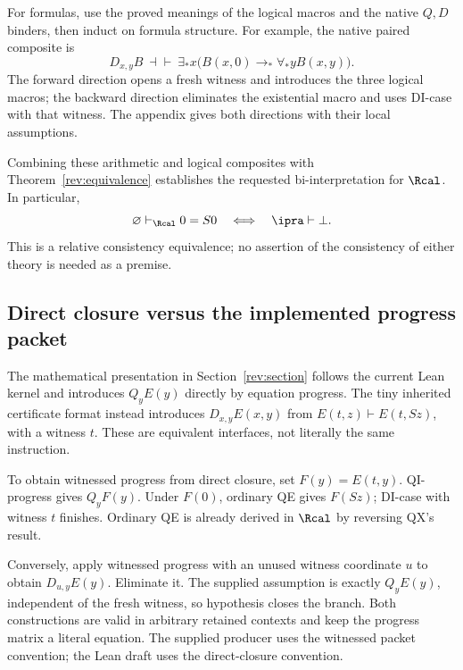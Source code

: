 For formulas, use the proved meanings of the logical macros and the
native $Q,D$ binders, then induct on formula structure. For example,
the native paired composite is
\[
 D_{x,y}B\ \dashv\vdash\
 \exists_*x\bigl(B(x,0)\to_*\forall_*y B(x,y)\bigr).
\]
The forward direction opens a fresh witness and introduces the three
logical macros; the backward direction eliminates the existential
macro and uses DI-case with that witness. The appendix gives both
directions with their local assumptions.

Combining these arithmetic and logical composites with
Theorem~\ref{rev:equivalence} establishes the requested bi-interpretation
for $\Rcal$. In particular,
\[
 \varnothing\vdash_{\Rcal}0=S0
 \quad\Longleftrightarrow\quad
 \ipra\vdash\bot.
\]
This is a relative consistency equivalence; no assertion of the
consistency of either theory is needed as a premise.

\subsection{Direct closure versus the implemented progress packet}
\label{sec:progress-packet}

The mathematical presentation in Section~\ref{rev:section} follows the
current Lean kernel and introduces $Q_yE(y)$ directly by equation
progress. The tiny inherited certificate format instead introduces
$D_{x,y}E(x,y)$ from $E(t,z)\vdash E(t,Sz)$, with a witness $t$.
These are equivalent interfaces, not literally the same instruction.

To obtain witnessed progress from direct closure, set $F(y)=E(t,y)$.
QI-progress gives $Q_yF(y)$. Under $F(0)$, ordinary QE gives $F(Sz)$;
DI-case with witness $t$ finishes. Ordinary QE is already derived in
$\Rcal$ by reversing QX's result.

Conversely, apply witnessed progress with an unused witness coordinate
$u$ to obtain $D_{u,y}E(y)$. Eliminate it. The supplied assumption is
exactly $Q_yE(y)$, independent of the fresh witness, so hypothesis
closes the branch. Both constructions are valid in arbitrary retained
contexts and keep the progress matrix a literal equation. The supplied
producer uses the witnessed packet convention; the Lean draft uses the
direct-closure convention.
